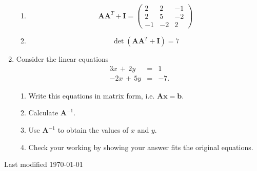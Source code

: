 \documentclass[11pt,a4paper]{article}
\def\bA{\mathbf{A}}
\def\bI{\mathbf{I}}
\begin{document}
\begin{enumerate}
{\begin{enumerate}
\item \[ \bA \bA^T + \bI= \left(
\begin{array}{ccc}
 2 & 2 & -1 \\
 2 & 5 & -2 \\
 -1 & -2 & 2
\end{array}
\right) \]
\item \[ \det( \bA \bA^T + \bI)=7 \] 

\end{enumerate}
\noindent\hrulefill	

}{}%



\item\label{q1172} Consider the linear equations
\begin{eqnarray*}
	3x\,+\,2y&=&1\\ 
	-2x\,+\,5y&=&-7.
\end{eqnarray*}
\begin{enumerate}
	\item Write this equations in matrix form, i.e. $\bA \mathbf{x}=\mathbf{b}$.
	\item Calculate $\bA^{-1}$. 
	\item Use $\bA^{-1}$ to obtain the values of $x$ and $y$.
	\item Check your working by showing your answer fits the original equations.
\end{enumerate}

%
\end{enumerate}
\hfill {\tiny Last modified  \today}
\vfill\eject
\end{document}
